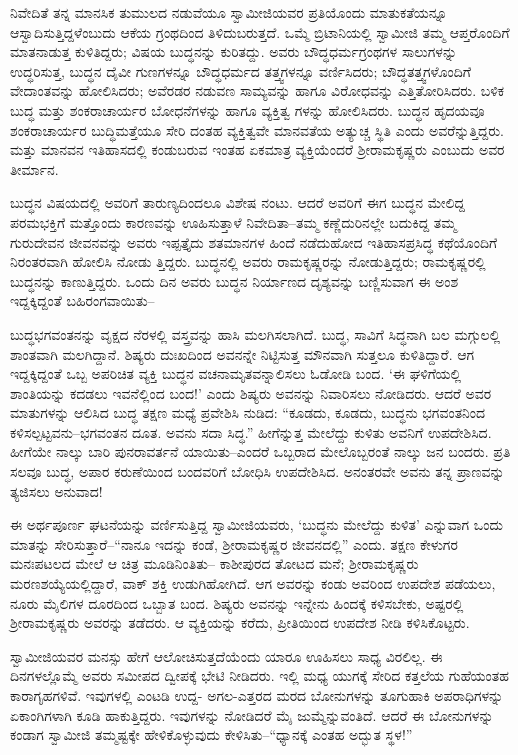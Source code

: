 ನಿವೇದಿತೆ ತನ್ನ ಮಾನಸಿಕ ತುಮುಲದ ನಡುವೆಯೂ ಸ್ವಾಮೀಜಿಯವರ ಪ್ರತಿಯೊಂದು ಮಾತುಕತೆಯನ್ನೂ ಆಸ್ವಾದಿಸುತ್ತಿದ್ದಳೆಂಬುದು ಆಕೆಯ ಗ್ರಂಥದಿಂದ ತಿಳಿದುಬರುತ್ತದೆ. ಒಮ್ಮೆ ಬ್ರಿಟಾನಿಯಲ್ಲಿ ಸ್ವಾಮೀಜಿ ತಮ್ಮ ಆಪ್ತರೊಂದಿಗೆ ಮಾತನಾಡುತ್ತ ಕುಳಿತಿದ್ದರು; ವಿಷಯ ಬುದ್ಧನನ್ನು ಕುರಿತದ್ದು. ಅವರು ಬೌದ್ಧಧರ್ಮಗ್ರಂಥಗಳ ಸಾಲುಗಳನ್ನು ಉದ್ಧರಿಸುತ್ತ, ಬುದ್ಧನ ದೈವೀ ಗುಣಗಳನ್ನೂ ಬೌದ್ಧಧರ್ಮದ ತತ್ತ್ವಗಳನ್ನೂ ವರ್ಣಿಸಿದರು; ಬೌದ್ಧತತ್ತ್ವಗಳೊಂದಿಗೆ ವೇದಾಂತವನ್ನು ಹೋಲಿಸಿದರು; ಅವೆರಡರ ನಡುವಣ ಸಾಮ್ಯವನ್ನು ಹಾಗೂ ವಿರೋಧವನ್ನು ಎತ್ತಿತೋರಿಸಿದರು. ಬಳಿಕ ಬುದ್ಧ ಮತ್ತು ಶಂಕರಾಚಾರ್ಯರ ಬೋಧನೆಗಳನ್ನು ಹಾಗೂ ವ್ಯಕ್ತಿತ್ವ ಗಳನ್ನು ಹೋಲಿಸಿದರು. ಬುದ್ಧನ ಹೃದಯವೂ ಶಂಕರಾಚಾರ್ಯರ ಬುದ್ಧಿಮತ್ತೆಯೂ ಸೇರಿ ದಂತಹ ವ್ಯಕ್ತಿತ್ವವೇ ಮಾನವತೆಯ ಅತ್ಯುಚ್ಚ ಸ್ಥಿತಿ ಎಂದು ಅವರೆನ್ನುತ್ತಿದ್ದರು. ಮತ್ತು ಮಾನವನ ಇತಿಹಾಸದಲ್ಲಿ ಕಂಡುಬರುವ ಇಂತಹ ಏಕಮಾತ್ರ ವ್ಯಕ್ತಿಯೆಂದರೆ ಶ್ರೀರಾಮಕೃಷ್ಣರು ಎಂಬುದು ಅವರ ತೀರ್ಮಾನ.

ಬುದ್ಧನ ವಿಷಯದಲ್ಲಿ ಅವರಿಗೆ ತಾರುಣ್ಯದಿಂದಲೂ ವಿಶೇಷ ನಂಟು. ಆದರೆ ಅವರಿಗೆ ಈಗ ಬುದ್ಧನ ಮೇಲಿದ್ದ ಪರಮಭಕ್ತಿಗೆ ಮತ್ತೊಂದು ಕಾರಣವನ್ನು ಊಹಿಸುತ್ತಾಳೆ ನಿವೇದಿತಾ–ತಮ್ಮ ಕಣ್ಣೆದುರಿನಲ್ಲೇ ಬದುಕಿದ್ದ ತಮ್ಮ ಗುರುದೇವನ ಜೀವನವನ್ನು ಅವರು ಇಪ್ಪತ್ತೈದು ಶತಮಾನಗಳ ಹಿಂದೆ ನಡೆದುಹೋದ ಇತಿಹಾಸಪ್ರಸಿದ್ಧ ಕಥೆಯೊಂದಿಗೆ ನಿರಂತರವಾಗಿ ಹೋಲಿಸಿ ನೋಡು ತ್ತಿದ್ದರು. ಬುದ್ಧನಲ್ಲಿ ಅವರು ರಾಮಕೃಷ್ಣರನ್ನು ನೋಡುತ್ತಿದ್ದರು; ರಾಮಕೃಷ್ಣರಲ್ಲಿ ಬುದ್ಧನನ್ನು ಕಾಣುತ್ತಿದ್ದರು. ಒಂದು ದಿನ ಅವರು ಬುದ್ಧನ ನಿರ್ಯಾಣದ ದೃಶ್ಯವನ್ನು ಬಣ್ಣಿಸುವಾಗ ಈ ಅಂಶ ಇದ್ದಕ್ಕಿದ್ದಂತೆ ಬಹಿರಂಗವಾಯಿತು–

ಬುದ್ಧಭಗವಂತನನ್ನು ವೃಕ್ಷದ ನೆರಳಲ್ಲಿ ವಸ್ತ್ರವನ್ನು ಹಾಸಿ ಮಲಗಿಸಲಾಗಿದೆ. ಬುದ್ಧ, ಸಾವಿಗೆ ಸಿದ್ಧನಾಗಿ ಬಲ ಮಗ್ಗುಲಲ್ಲಿ ಶಾಂತವಾಗಿ ಮಲಗಿದ್ದಾನೆ. ಶಿಷ್ಯರು ದುಃಖದಿಂದ ಅವನನ್ನೇ ನಿಟ್ಟಿಸುತ್ತ ಮೌನವಾಗಿ ಸುತ್ತಲೂ ಕುಳಿತಿದ್ದಾರೆ. ಆಗ ಇದ್ದಕ್ಕಿದ್ದಂತೆ ಒಬ್ಬ ಅಪರಿಚಿತ ವ್ಯಕ್ತಿ ಬುದ್ಧನ ವಚನಾಮೃತವನ್ನಾಲಿಸಲು ಓಡೋಡಿ ಬಂದ. ‘ಈ ಘಳಿಗೆಯಲ್ಲಿ ಶಾಂತಿಯನ್ನು ಕದಡಲು ಇವನೆಲ್ಲಿಂದ ಬಂದ!’ ಎಂದು ಶಿಷ್ಯರು ಅವನನ್ನು ನಿವಾರಿಸಲು ನೋಡಿದರು. ಆದರೆ ಅವರ ಮಾತುಗಳನ್ನು ಆಲಿಸಿದ ಬುದ್ಧ ತಕ್ಷಣ ಮಧ್ಯೆ ಪ್ರವೇಶಿಸಿ ನುಡಿದ: “ಕೂಡದು, ಕೂಡದು, ಬುದ್ಧನು ಭಗವಂತನಿಂದ ಕಳಿಸಲ್ಪಟ್ಟವನು–ಭಗವಂತನ ದೂತ. ಅವನು ಸದಾ ಸಿದ್ಧ.” ಹೀಗೆನ್ನುತ್ತ ಮೇಲೆದ್ದು ಕುಳಿತು ಅವನಿಗೆ ಉಪದೇಶಿಸಿದ. ಹೀಗೆಯೇ ನಾಲ್ಕು ಬಾರಿ ಪುನರಾವರ್ತನೆ ಯಾಯಿತು–ಎಂದರೆ ಒಬ್ಬರಾದ ಮೇಲೊಬ್ಬರಂತೆ ನಾಲ್ಕು ಜನ ಬಂದರು. ಪ್ರತಿ ಸಲವೂ ಬುದ್ಧ, ಅಪಾರ ಕರುಣೆಯಿಂದ ಬಂದವರಿಗೆ ಬೋಧಿಸಿ ಉಪದೇಶಿಸಿದ. ಅನಂತರವೇ ಅವನು ತನ್ನ ಪ್ರಾಣವನ್ನು ತ್ಯಜಿಸಲು ಅನುವಾದ!

ಈ ಅರ್ಥಪೂರ್ಣ ಘಟನೆಯನ್ನು ವರ್ಣಿಸುತ್ತಿದ್ದ ಸ್ವಾಮೀಜಿಯವರು, ‘ಬುದ್ಧನು ಮೇಲೆದ್ದು ಕುಳಿತ’ ಎನ್ನುವಾಗ ಒಂದು ಮಾತನ್ನು ಸೇರಿಸುತ್ತಾರೆ–“ನಾನೂ ಇದನ್ನು ಕಂಡೆ, ಶ್ರೀರಾಮಕೃಷ್ಣರ ಜೀವನದಲ್ಲಿ” ಎಂದು. ತಕ್ಷಣ ಕೇಳುಗರ ಮನಃಪಟಲದ ಮೇಲೆ ಆ ಚಿತ್ರ ಮೂಡಿನಿಂತಿತು– ಕಾಶೀಪುರದ ತೋಟದ ಮನೆ; ಶ್ರೀರಾಮಕೃಷ್ಣರು ಮರಣಶಯ್ಯೆಯಲ್ಲಿದ್ದಾರೆ, ವಾಕ್ ಶಕ್ತಿ ಉಡುಗಿಹೋಗಿದೆ. ಆಗ ಅವರನ್ನು ಕಂಡು ಅವರಿಂದ ಉಪದೇಶ ಪಡೆಯಲು, ನೂರು ಮೈಲಿಗಳ ದೂರದಿಂದ ಒಬ್ಬಾತ ಬಂದ. ಶಿಷ್ಯರು ಅವನನ್ನು ಇನ್ನೇನು ಹಿಂದಕ್ಕೆ ಕಳಿಸಬೇಕು, ಅಷ್ಟರಲ್ಲಿ ಶ್ರೀರಾಮಕೃಷ್ಣರು ಅವರನ್ನು ತಡೆದರು. ಆ ವ್ಯಕ್ತಿಯನ್ನು ಕರೆದು, ಪ್ರೀತಿಯಿಂದ ಉಪದೇಶ ನೀಡಿ ಕಳಿಸಿಕೊಟ್ಟರು.

ಸ್ವಾಮೀಜಿಯವರ ಮನಸ್ಸು ಹೇಗೆ ಆಲೋಚಿಸುತ್ತದೆಯೆಂದು ಯಾರೂ ಊಹಿಸಲು ಸಾಧ್ಯ ವಿರಲಿಲ್ಲ. ಈ ದಿನಗಳಲ್ಲೊಮ್ಮೆ ಅವರು ಸಮೀಪದ ದ್ವೀಪಕ್ಕೆ ಭೇಟಿ ನೀಡಿದರು. ಇಲ್ಲಿ ಮಧ್ಯ ಯುಗಕ್ಕೆ ಸೇರಿದ ಕತ್ತಲೆಯ ಗುಹೆಯಂತಹ ಕಾರಾಗೃಹಗಳಿವೆ. ಇವುಗಳಲ್ಲಿ ಎಂಟಡಿ ಉದ್ದ- ಅಗಲ-ಎತ್ತರದ ಮರದ ಬೋನುಗಳನ್ನು ತೂಗುಹಾಕಿ ಅಪರಾಧಿಗಳನ್ನು ಏಕಾಂಗಿಗಳಾಗಿ ಕೂಡಿ ಹಾಕುತ್ತಿದ್ದರು. ಇವುಗಳನ್ನು ನೋಡಿದರೆ ಮೈ ಜುಮ್ಮೆನ್ನುವಂತಿದೆ. ಆದರೆ ಈ ಬೋನುಗಳನ್ನು ಕಂಡಾಗ ಸ್ವಾಮೀಜಿ ತಮ್ಮಷ್ಟಕ್ಕೇ ಹೇಳಿಕೊಳ್ಳುವುದು ಕೇಳಿಸಿತು–“ಧ್ಯಾನಕ್ಕೆ ಎಂತಹ ಅದ್ಭುತ ಸ್ಥಳ!”

